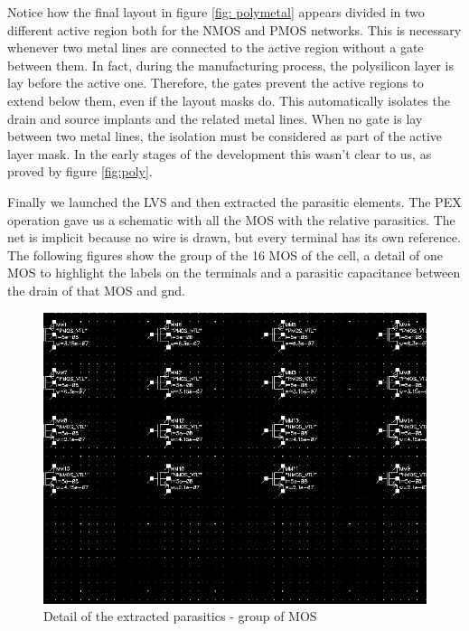 \documentclass[a4paper]{article}
\begin{document}
Notice how the final layout in figure \ref{fig: polymetal} appears divided in two different active region both for the NMOS and PMOS networks. This is necessary whenever two metal lines are connected to the active region without a gate between them. In fact, during the manufacturing process, the polysilicon layer is lay before the active one. Therefore, the gates prevent the active regions to extend below them, even if the layout masks do. This automatically isolates the drain and source implants and the related metal lines. When no gate is lay between two metal lines, the isolation must be considered as part of the active layer mask. In the early stages of the development this wasn't clear to us, as proved by figure \ref{fig:poly}.

Finally we launched the LVS and then extracted the parasitic elements. The PEX operation gave us a schematic with all the MOS with the relative parasitics. The net is implicit because no wire is drawn, but every terminal has its own reference. The following figures show the group of the 16 MOS of the cell, a detail of one MOS to highlight the labels on the terminals and a parasitic capacitance between the drain of that MOS and gnd.

\begin{figure}[H]
      \centering
       \includegraphics[width=12cm]{./Images/HA/HAX1_PEX.png}
\caption{Detail of the extracted parasitics - group of MOS}
\label{fig: PEX0}
\end{figure}
\end{document}
